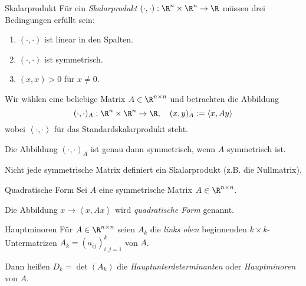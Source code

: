 \documentclass[german]{../spicker}
\newcommand{\scalarprod}[1]{\left\langle #1 \right\rangle}
\begin{document}
\begin{defi}{Skalarprodukt}
    Für ein \emph{Skalarprodukt} $(\cdot, \cdot) : \R^n \times \R^n \to \R$ müssen drei Bedingungen erfüllt sein:
    \begin{enumerate}
        \item $(\cdot, \cdot)$ ist linear in den Spalten.
        \item $(\cdot, \cdot)$ ist symmetrisch.
        \item $(x, x) > 0$ für $x \neq 0$.
    \end{enumerate}

    Wir wählen eine beliebige Matrix $A \in \R^{n\times n}$ und betrachten die Abbildung
    $$
        (\cdot, \cdot)_A : \R^n \times \R^n \to \R, \quad (x, y)_A := \scalarprod{x, Ay}
    $$
    wobei $\scalarprod{\cdot, \cdot}$ für das Standardskalarprodukt steht.

    Die Abbildung $(\cdot, \cdot)_A$ ist genau dann symmetrisch, wenn $A$ symmetrisch ist.

    Nicht jede symmetrische Matrix definiert ein Skalarprodukt (z.B. die Nullmatrix).
\end{defi}

\begin{defi}{Quadratische Form}
    Sei $A$ eine symmetrische Matrix $A \in \R^{n\times n}$.

    Die Abbildung $x \to \scalarprod{x, Ax}$ wird \emph{quadratische Form} genannt.
\end{defi}

\begin{defi}{Hauptminoren}
    Für $A \in \R^{n\times n}$ seien $A_k$ die \emph{links oben} beginnenden $k \times k$-Untermatrizen $A_k = (a_{ij})^k_{i,j=1}$ von $A$.

    Dann heißen $D_k = \det(A_k)$ die \emph{Hauptunterdeterminanten} oder \emph{Hauptminoren} von $A$.
\end{defi}
\end{document}
